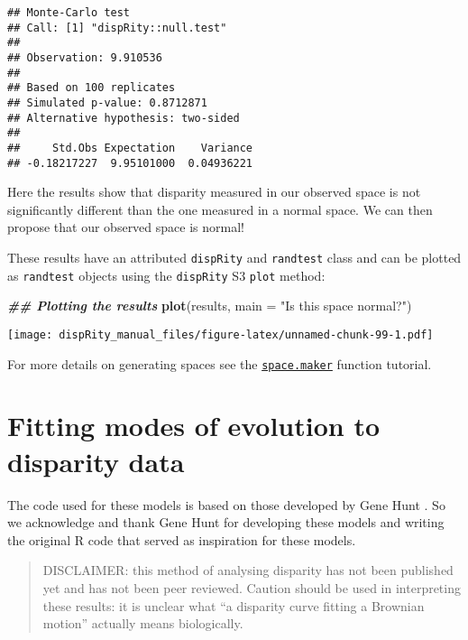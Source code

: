 \documentclass[
]{book}
\newenvironment{Shaded}{\begin{snugshade}}{\end{snugshade}}
\newcommand{\AttributeTok}[1]{\textcolor[rgb]{0.13,0.29,0.53}{#1}}
\newcommand{\DocumentationTok}[1]{\textcolor[rgb]{0.56,0.35,0.01}{\textbf{\textit{#1}}}}
\newcommand{\FunctionTok}[1]{\textcolor[rgb]{0.13,0.29,0.53}{\textbf{#1}}}
\newcommand{\NormalTok}[1]{#1}
\newcommand{\StringTok}[1]{\textcolor[rgb]{0.31,0.60,0.02}{#1}}
\begin{document}
\begin{verbatim}
## Monte-Carlo test
## Call: [1] "dispRity::null.test"
## 
## Observation: 9.910536 
## 
## Based on 100 replicates
## Simulated p-value: 0.8712871 
## Alternative hypothesis: two-sided 
## 
##     Std.Obs Expectation    Variance 
## -0.18217227  9.95101000  0.04936221
\end{verbatim}

Here the results show that disparity measured in our observed space is not significantly different than the one measured in a normal space.
We can then propose that our observed space is normal!

These results have an attributed \texttt{dispRity} and \texttt{randtest} class and can be plotted as \texttt{randtest} objects using the \texttt{dispRity} S3 \texttt{plot} method:

\begin{Shaded}
\begin{Highlighting}[]
\DocumentationTok{\#\# Plotting the results}
\FunctionTok{plot}\NormalTok{(results, }\AttributeTok{main =} \StringTok{"Is this space normal?"}\NormalTok{)}
\end{Highlighting}
\end{Shaded}

\texttt{[image: dispRity\_manual\_files/figure-latex/unnamed-chunk-99-1.pdf]}

For more details on generating spaces see the \protect\hyperlink{Simulating-multidimensional-spaces}{\texttt{space.maker}} function tutorial.

\hypertarget{model-fitting}{%
\section{Fitting modes of evolution to disparity data}\label{model-fitting}}

The code used for these models is based on those developed by Gene Hunt \citep{hunt2006fitting, hunt2012measuring, hunt2015simple}.
So we acknowledge and thank Gene Hunt for developing these models and writing the original R code that served as inspiration for these models.

\begin{quote}
DISCLAIMER: this method of analysing disparity has not been published yet and has not been peer reviewed. Caution should be used in interpreting these results: it is unclear what ``a disparity curve fitting a Brownian motion'' actually means biologically.
\end{quote}
\end{document}
